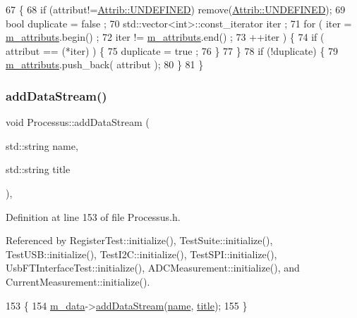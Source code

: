 \begin{DoxyCode}
67                             \{
68     \textcolor{keywordflow}{if} (attribut!=\hyperlink{classAttrib_a69e171d7cc6417835a5a306d3c764235a3a8da2ab97dda18aebab196fe4100531}{Attrib::UNDEFINED}) \textcolor{keyword}{remove}(\hyperlink{classAttrib_a69e171d7cc6417835a5a306d3c764235a3a8da2ab97dda18aebab196fe4100531}{Attrib::UNDEFINED});
69     \textcolor{keywordtype}{bool} duplicate = false ;
70     std::vector<int>::const\_iterator iter ;
71     \textcolor{keywordflow}{for} ( iter  = \hyperlink{classAttrib_ac4bd58a0cc6b38a3b711d609a3d3aacc}{m\_attributs}.begin() ;
72           iter != \hyperlink{classAttrib_ac4bd58a0cc6b38a3b711d609a3d3aacc}{m\_attributs}.end()   ;
73           ++iter ) \{
74       \textcolor{keywordflow}{if} ( attribut == (*iter) ) \{
75         duplicate = true ;
76       \}
77     \}
78     \textcolor{keywordflow}{if} (!duplicate) \{
79       \hyperlink{classAttrib_ac4bd58a0cc6b38a3b711d609a3d3aacc}{m\_attributs}.push\_back( attribut );
80     \}
81   \}
\end{DoxyCode}
\mbox{\label{classProcessus_a308c8f193802f1d1ab49d4447d0cb281}} 
\subsubsection{\texorpdfstring{add\+Data\+Stream()}{addDataStream()}}
{\footnotesize\ttfamily void Processus\+::add\+Data\+Stream (\begin{DoxyParamCaption}\item[{std\+::string}]{name,  }\item[{std\+::string}]{title }\end{DoxyParamCaption})\hspace{0.3cm}{\ttfamily [inline]}, {\ttfamily [inherited]}}



Definition at line 153 of file Processus.\+h.



Referenced by Register\+Test\+::initialize(), Test\+Suite\+::initialize(), Test\+U\+S\+B\+::initialize(), Test\+I2\+C\+::initialize(), Test\+S\+P\+I\+::initialize(), Usb\+F\+T\+Interface\+Test\+::initialize(), A\+D\+C\+Measurement\+::initialize(), and Current\+Measurement\+::initialize().


\begin{DoxyCode}
153                                                        \{
154     \hyperlink{classProcessus_a3da9a9de8af54e2f47807a3e09dfccff}{m\_data}->\hyperlink{classData_a33c31859f6b2771ebd4f0b83fa44739c}{addDataStream}(\hyperlink{classObject_a300f4c05dd468c7bb8b3c968868443c1}{name}, \hyperlink{classObject_a73a0f1a41828fdd8303dd662446fb6c3}{title});
155   \}
\end{DoxyCode}
\mbox{\label{classProcessus_ad46e0d4dfdfdcbce001ee6be1746dfa4}} 
